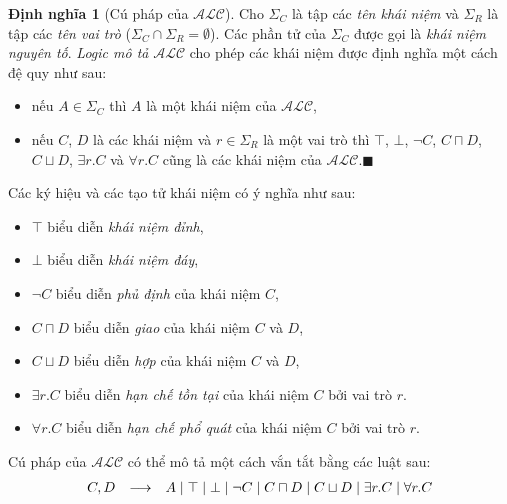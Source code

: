 \documentclass[12pt,a4paper,twoside]{report}
\newcommand{\SigmaC}	{\Sigma_C}
\newcommand{\SigmaR}	{\Sigma_R}
\newcommand{\ALC}		{$\mathcal{ALC}$\xspace}
\newcommand{\myend}		{\mbox{}\hfill\mbox{{\scriptsize$\!\blacksquare$}}}
\newcommand{\mand}		{\sqcap}
\newcommand{\mor}		{\sqcup}
\newcommand{\V}			{\forall}
\newcommand{\E}			{\exists}
\theoremstyle{definition}
\newtheorem{Definition}{Định nghĩa}[chapter]
\begin{document}
\begin{Definition}[Cú pháp của \ALC]
\label{ALC-Syntax}
Cho $\SigmaC$ là tập các {\em tên khái niệm} và $\SigmaR$ là tập các {\em tên vai trò} ($\SigmaC \cap \SigmaR = \emptyset$). Các phần tử của $\SigmaC$ được gọi là {\em khái niệm nguyên tố}. {\em Logic mô tả} \ALC cho phép các khái niệm được định nghĩa một cách đệ quy như sau:

\begin{itemize}
  \item nếu $A \in \SigmaC$ thì $A$ là một khái niệm của \ALC,
  \item nếu $C$, $D$ là các khái niệm và $r \in \SigmaR$ là một vai trò thì $\top$, $\bot$, $\neg C$, $C \mand D$, $C \mor D$, $\E r.C$ và $\V r.C$ cũng là các khái niệm của \ALC.\myend
\end{itemize}
\end{Definition}
%
\noindent
Các ký hiệu và các tạo tử khái niệm có ý nghĩa như sau:
\begin{itemize}
  \item $\top$ biểu diễn {\em khái niệm đỉnh},
  \item $\bot$ biểu diễn {\em khái niệm đáy},
  \item $\neg C$ biểu diễn {\em phủ định} của khái niệm $C$,
  \item $C \mand D$ biểu diễn {\em giao} của khái niệm $C$ và $D$,
  \item $C \mor D$ biểu diễn {\em hợp} của khái niệm $C$ và $D$,
  \item $\E r.C$ biểu diễn {\em hạn chế tồn tại} của khái niệm $C$ bởi vai trò $r$.
  \item $\V r.C$ biểu diễn {\em hạn chế phổ quát} của khái niệm $C$ bởi vai trò $r$.
\end{itemize}
%
Cú pháp của \ALC có thể mô tả một cách vắn tắt bằng các luật sau:
\[
  \begin{array}{r c l}
    C, D & \longrightarrow&
    A \mid 
    \top \mid 
    \bot \mid 
    \neg C \mid 
    C\mand D \mid 
    C \mor D \mid 
    \E r.C \mid
    \V r.C
  \end{array}
\]
\end{document}
